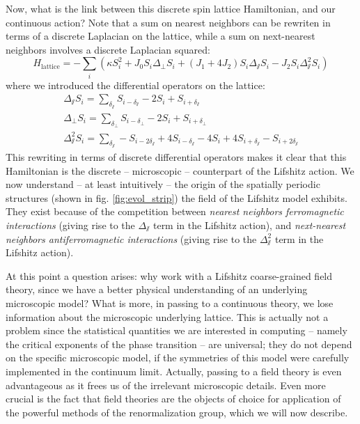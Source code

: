  Now, what is the link between this discrete spin lattice Hamiltonian, and our continuous action?
Note that a sum on nearest neighbors can be rewriten in terms of a discrete Laplacian on the lattice, while a sum on next-nearest neighbors involves a discrete Laplacian squared:
\begin{equation}
H_{\text{lattice}} = -\sum_i \left( \kappa S_i^2 + J_0 S_i \Delta_\perp S_i + (J_1 + 4 J_2) S_i \Delta_\sslash S_i - J_2 S_i \Delta_\sslash^2 S_i \right)
\end{equation}
where we introduced the differential operators on the lattice:
\begin{align}
\Delta_\sslash S_i = \sum_{\delta_\sslash} S_{i-\delta_\sslash} - 2 S_i + S_{i+\delta_\sslash} \\
\Delta_\perp S_i = \sum_{\delta_\perp} S_{i-\delta_\perp} - 2 S_i + S_{i+\delta_\perp} \\
\Delta_\sslash^2 S_i = \sum_{\delta_\sslash} -S_{i-2\delta_\sslash} +  4 S_{i-\delta_\sslash} - 4 S_i + 4S_{i+\delta_\sslash} - S_{i+2\delta_\sslash}
\end{align}
This rewriting in terms of discrete differential operators makes it clear that this Hamiltonian is the discrete -- microscopic -- counterpart of the Lifshitz action. We now understand -- at least intuitively -- the origin of the spatially periodic structures (shown in fig. \eqref{fig:evol_strip}) the field of the Lifshitz model exhibits. They exist because of the competition between \textit{nearest neighbors ferromagnetic interactions} (giving rise to the $\Delta_\sslash$ term in the Lifshitz action), and \textit{next-nearest neighbors antiferromagnetic interactions} (giving rise to the $\Delta_\sslash^2$ term in the Lifshitz action).

At this point a question arises: why work with a Lifshitz coarse-grained field theory, since we have a better physical understanding of an underlying microscopic model? What is more, in passing to a continuous theory, we lose information about the microscopic underlying lattice. 
This is actually not a problem since the statistical quantities we are interested in computing -- namely the critical exponents of the phase transition -- are universal; they do not depend on the specific microscopic model, if the symmetries of this model were carefully implemented in the continuum limit. Actually, passing to a field theory is even advantageous as it frees us of the irrelevant microscopic details. 
Even more crucial is the fact that field theories are the objects of choice for application of the powerful methods of the renormalization group, which we will now describe.